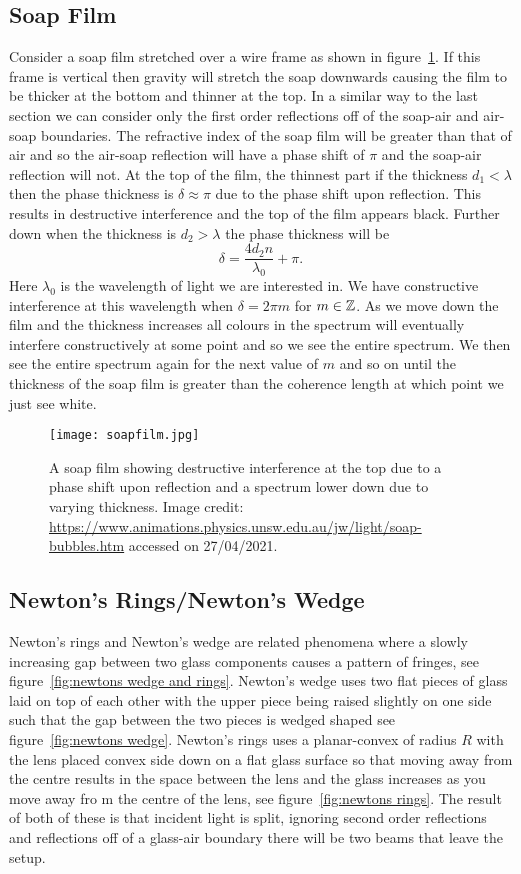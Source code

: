     \subsection{Soap Film}
    Consider a soap film stretched over a wire frame as shown in figure~\ref{fig:soap film}.
    If this frame is vertical then gravity will stretch the soap downwards causing the film to be thicker at the bottom and thinner at the top.
    In a similar way to the last section we can consider only the first order reflections off of the soap-air and air-soap boundaries.
    The refractive index of the soap film will be greater than that of air and so the air-soap reflection will have a phase shift of \(\pi\) and the soap-air reflection will not.
    At the top of the film, the thinnest part if the thickness \(d_1 < \lambda\) then the phase thickness is \(\delta \approx \pi\) due to the phase shift upon reflection.
    This results in destructive interference and the top of the film appears black.
    Further down when the thickness is \(d_2 > \lambda\) the phase thickness will be
    \[\delta = \frac{4d_2n}{\lambda_0} + \pi.\]
    Here \(\lambda_0\) is the wavelength of light we are interested in.
    We have constructive interference at this wavelength when \(\delta = 2\pi m\) for \(m\in\mathbb{Z}\).
    As we move down the film and the thickness increases all colours in the spectrum will eventually interfere constructively at some point and so we see the entire spectrum.
    We then see the entire spectrum again for the next value of \(m\) and so on until the thickness of the soap film is greater than the coherence length at which point we just see white.
    \begin{figure}[htbp!]
        \centering
        \texttt{[image: soapfilm.jpg]}
        \caption{A soap film showing destructive interference at the top due to a phase shift upon reflection and a spectrum lower down due to varying thickness. Image credit: \url{https://www.animations.physics.unsw.edu.au/jw/light/soap-bubbles.htm} accessed on 27/04/2021.}
        \label{fig:soap film}
    \end{figure}
    
    \subsection{Newton's Rings/Newton's Wedge}
    Newton's rings and Newton's wedge are related phenomena where a slowly increasing gap between two glass components causes a pattern of fringes, see figure~\ref{fig:newtons wedge and rings}.
    Newton's wedge uses two flat pieces of glass laid on top of each other with the upper piece being raised slightly on one side such that the gap between the two pieces is wedged shaped see figure~\ref{fig:newtons wedge}.
    Newton's rings uses a planar-convex of radius \(R\) with the lens placed convex side down on a flat glass surface so that moving away from the centre results in the space between the lens and the glass increases as you move away fro m the centre of the lens, see figure~\ref{fig:newtons rings}.
    The result of both of these is that incident light is split, ignoring second order reflections and reflections off of a glass-air boundary there will be two beams that leave the setup.
    
